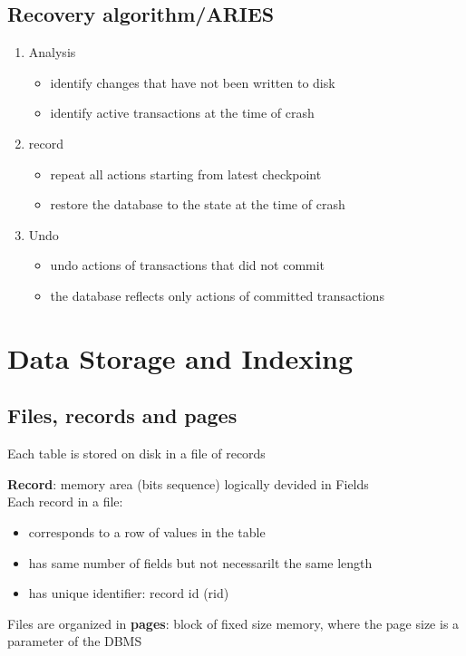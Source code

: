 \documentclass{article}
\begin{document}
\subsection{Recovery algorithm/ARIES}
\begin{enumerate}
  \item Analysis \begin{itemize}
          \item identify changes that have not been written to disk
          \item identify active transactions at the time of crash
        \end{itemize}
  \item record \begin{itemize}
          \item repeat all actions starting from latest checkpoint
          \item restore the database to the state at the time of crash
        \end{itemize}
  \item Undo \begin{itemize}
          \item undo actions of transactions that did not commit
          \item the database reflects only actions of committed transactions
        \end{itemize}
\end{enumerate}

\section{Data Storage and Indexing}
\subsection{Files, records and pages}
Each table is stored on disk in a file of records

\textbf{Record}: memory area (bits sequence) logically devided in Fields
\\Each record in a file: \begin{itemize}
  \item corresponds to a row of values in the table
  \item has same number of fields but not necessarilt the same length
  \item has unique identifier: record id (rid)
\end{itemize} 

Files are organized in \textbf{pages}: block of fixed size memory, where the page size is a parameter of the DBMS
\end{document}
